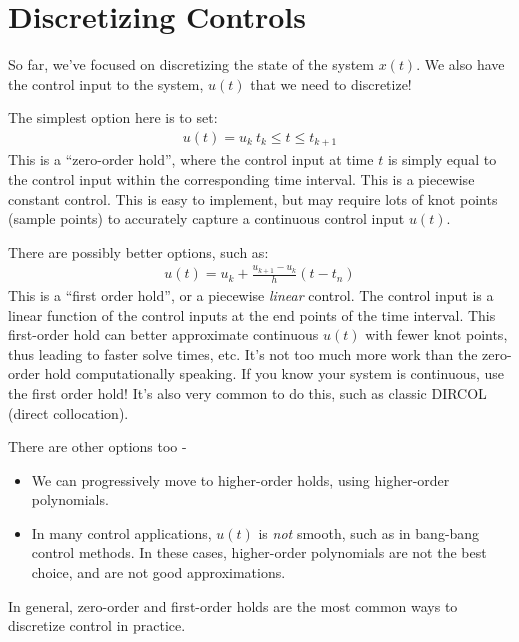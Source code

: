 \section{Discretizing Controls}
So far, we've focused on discretizing the state of the system $x(t)$. We also have the control input to the system, $u(t)$ that we need to discretize!

\noindent
The simplest option here is to set: 
\begin{align}
    u(t) = u_k  \ t_{k} \leq t \leq t_{k+1} 
\end{align}
This is a ``zero-order hold'', where the control input at time $t$ is simply equal to the control input within the corresponding time interval. This is a piecewise constant control. 
This is easy to implement, but may require lots of knot points (sample points) to accurately capture a continuous control input $u(t)$.

\noindent
There are possibly better options, such as:
 \begin{align}
     u(t) = u_{k} + \frac{u_{k+1}-u_k}{h} (t-t_n)
 \end{align}
This is a ``first order hold'', or a piecewise \textit{linear} control. The control input is a linear function of the control inputs at the end points of the time interval. 
This first-order hold can better approximate continuous $u(t)$ with fewer knot points, thus leading to faster solve times, etc. It's not too much more work than the zero-order hold computationally speaking. If you know your system is continuous, use the first order hold! 
It's also very common to do this, such as classic DIRCOL (direct collocation). 

\noindent
There are other options too - 
\begin{itemize}
    \item We can progressively move to higher-order holds, using higher-order polynomials. 
    \item In many control applications, $u(t)$ is \textit{not} smooth, such as in bang-bang control methods. In these cases, higher-order polynomials are not the best choice, and are not good approximations. 
\end{itemize}

\noindent
In general, zero-order and first-order holds are the most common ways to discretize control in practice.


